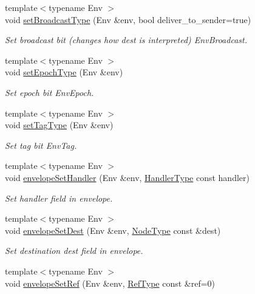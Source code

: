 \begin{DoxyCompactItemize}
{\footnotesize template$<$typename Env $>$ }\\void \hyperlink{namespacevt_af6e10f3d27abb3321ca34830880c0f7a}{set\+Broadcast\+Type} (Env \&env, bool deliver\+\_\+to\+\_\+sender=true)
\begin{DoxyCompactList}\small\item\em Set broadcast bit (changes how {\ttfamily dest} is interpreted) {\ttfamily Env\+Broadcast}. \end{DoxyCompactList}\item 
{\footnotesize template$<$typename Env $>$ }\\void \hyperlink{namespacevt_afb12c8cb2f8d47e2f06ffa25574f0dd0}{set\+Epoch\+Type} (Env \&env)
\begin{DoxyCompactList}\small\item\em Set epoch bit {\ttfamily Env\+Epoch}. \end{DoxyCompactList}\item 
{\footnotesize template$<$typename Env $>$ }\\void \hyperlink{namespacevt_ad088db89648b82eef7ca9b4837a907cd}{set\+Tag\+Type} (Env \&env)
\begin{DoxyCompactList}\small\item\em Set tag bit {\ttfamily Env\+Tag}. \end{DoxyCompactList}\item 
{\footnotesize template$<$typename Env $>$ }\\void \hyperlink{namespacevt_a48ddc3677e112fd6f53d0f918c21300e}{envelope\+Set\+Handler} (Env \&env, \hyperlink{namespacevt_af64846b57dfcaf104da3ef6967917573}{Handler\+Type} const handler)
\begin{DoxyCompactList}\small\item\em Set handler field in envelope. \end{DoxyCompactList}\item 
{\footnotesize template$<$typename Env $>$ }\\void \hyperlink{namespacevt_a78ef1cf108e91a92d83c525fd16fbd4d}{envelope\+Set\+Dest} (Env \&env, \hyperlink{namespacevt_a866da9d0efc19c0a1ce79e9e492f47e2}{Node\+Type} const \&dest)
\begin{DoxyCompactList}\small\item\em Set destination {\ttfamily dest} field in envelope. \end{DoxyCompactList}\item 
{\footnotesize template$<$typename Env $>$ }\\void \hyperlink{namespacevt_a43dd08b8f10d3a1c79872a759aa11662}{envelope\+Set\+Ref} (Env \&env, \hyperlink{namespacevt_a9b39ce9494bb04674d0d5b895a5aa50f}{Ref\+Type} const \&ref=0)

\end{DoxyCompactItemize}
